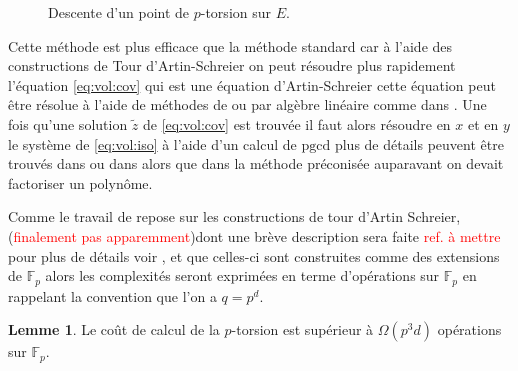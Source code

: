 \documentclass[10pt,a4paper]{book}
\theoremstyle{plain}
\theoremstyle{definition}
\newtheorem{lem}[thm]{Lemme}
\theoremstyle{definition}
\theoremstyle{definition}
\theoremstyle{definition}
\theoremstyle{remark}
\theoremstyle{remark}
\theoremstyle{definition}
\begin{document}
\begin{figure}
\begin{center}
\label{fig:dra:des}
\caption{Descente d'un point de $p$-torsion sur $E$.}
\end{center}
\end{figure}

Cette méthode est plus efficace que la méthode standard car à l'aide des constructions de Tour d'Artin-Schreier on peut résoudre plus rapidement l'équation \eqref{eq:vol:cov} qui est une équation d'Artin-Schreier cette équation peut être résolue à l'aide de méthodes de \cite[§6.1]{DeFeo-Shost'12} ou par algèbre linéaire comme dans \cite{Couveignes96}. Une fois qu'une solution $\tilde{z}$ de \eqref{eq:vol:cov} est trouvée il faut alors résoudre en $x$ et en $y$ le système de \eqref{eq:vol:iso} à l'aide d'un calcul de $\mathrm{pgcd}$ plus de détails peuvent être trouvés dans \cite[§6.2]{Ler97a} ou dans \cite[§7]{DeFeo11} alors que dans la méthode préconisée auparavant on devait factoriser un polynôme.

Comme le travail de \cite{DeFeo11} repose sur les constructions de tour d'Artin Schreier, (\textcolor{red}{finalement pas apparemment})dont une brève description sera faite \textcolor{red}{ref. à mettre} pour plus de détails voir \cite{DeFeo-Shost'12}, et que celles-ci sont construites comme des extensions de $\mathbb{F}_p$ alors les complexités seront exprimées en terme d'opérations sur $\mathbb{F}_p$ en rappelant la convention que l'on a $q=p^d$.

\begin{lem}
Le coût de calcul de la $p$-torsion est supérieur à  $\Omega(p^3d)$ opérations sur $\mathbb{F}_p$.
\end{lem}
\end{document}
